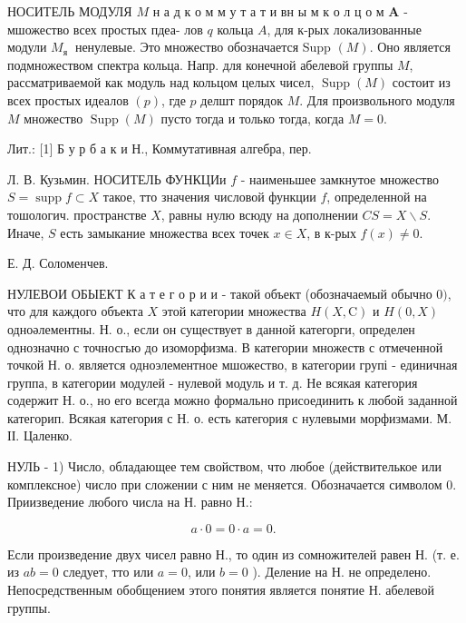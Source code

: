 \documentclass[10pt]{article}
\begin{document}
НОСИТЕЛЬ МОДУЛЯ $M$ н а д к о м м у т а т и вн ы м к о л ц о м $\boldsymbol{A}$ - мшожество всех простых пдеа- лов $q$ кольца $A$, для к-рых локализованные модули $M_{\text {я }}$ ненулевые. Это множество обозначается Supp $(M)$. Оно является подмножеством спектра кольца. Напр. для конечной абелевой группы $M$, рассматриваемой как модуль над кольцом целых чисел, $\operatorname{Supp}(M)$ состоит из всех простых идеалов $(p)$, где $p$ делшт порядок $M$. Для произвольного модуля $M$ множество $\operatorname{Supp}(M)$ пусто тогда и только тогда, когда $M=0$.



Лит.: [1] Б у р б а к и Н., Коммутативная алгебра, пер.



Л. В. Кузьмин. НОСИТЕЛЬ ФУНКЦИи $f$ - наименьшее замкнутое множество $S=\operatorname{supp} f \subset X$ такое, тто значения числовой функции $f$, определенной на тошологич. пространстве $X$, равны нулю всюду на дополнении $C S=X \backslash S$. Иначе, $S$ есть замыкание множества всех точек $x \in X$, в к-рых $f(x) \neq 0$.



Е. Д. Соломенчев.



НУЛЕВОИ ОБЫЕКТ К а т е г о р и и - такой объект (обозначаемый обычно 0$)$, что для каждого объекта $X$ этой категории множества $H(X, \mathrm{C})$ и $H(0, X)$ одноәлементны. Н. о., если он существует в данной категорги, определен однозначно с точносгью до изоморфизма. В категории множеств с отмеченной точкой Н. о. является одноэлементное мшожество, в категории групі - единичная группа, в категории модулей - нулевой модуль и т. д. Не всякая категория содержит Н. о., но его всегда можно формально присоединить к любой заданной категорип. Всякая категория с Н. о. есть категория с нулевыми морфизмами. М. ІІ. Цаленко.



НУЛЬ - 1) Число, обладающее тем свойством, что любое (действителькое или комплексное) число при сложении с ним не меняется. Обозначается символом 0. Приизведение любого числа на Н. равно Н.:



\[

a \cdot 0=0 \cdot a=0 \text {. }

\]



Если произведение двух чисел равно Н., то один из сомножителей равен Н. (т. е. из $a b=0$ следует, тто или $a=0$, или $b=0$ ). Деление на Н. не определено. Непосредственным обобщением этого понятия является понятие Н. абелевой группы.
\end{document}
